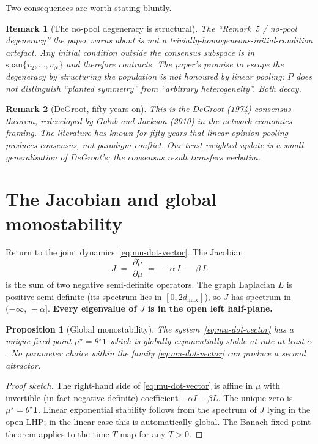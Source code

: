 \documentclass[11pt,a4paper]{article}
\theoremstyle{plain}
\newtheorem{proposition}{Proposition}
\newtheorem{remark}{Remark}
\begin{document}
Two consequences are worth stating bluntly.

\begin{remark}[The no-pool degeneracy is structural]
The ``Remark~5 / no-pool degeneracy'' the paper warns about is not a
trivially-homogeneous-initial-condition artefact. \emph{Any} initial
condition outside the consensus subspace is in $\mathrm{span}\{v_2,
\dots, v_N\}$ and therefore contracts. The paper's promise to escape
the degeneracy by structuring the population is not honoured by linear
pooling: $P$ does not distinguish ``planted symmetry'' from ``arbitrary
heterogeneity''. Both decay.
\end{remark}

\begin{remark}[DeGroot, fifty years on]
This is the DeGroot (1974) consensus theorem, redeveloped by Golub and
Jackson (2010) in the network-economics framing. The literature has
known for fifty years that linear opinion pooling produces consensus,
not paradigm conflict. Our trust-weighted update is a small
generalisation of DeGroot's; the consensus result transfers verbatim.
\end{remark}

\section{The Jacobian and global monostability}
\label{sec:jacobian}

Return to the joint dynamics~\eqref{eq:mu-dot-vector}. The Jacobian
\[
J \;=\; \frac{\partial \dot{\mu}}{\partial \mu}
   \;=\; -\alpha\, I \;-\; \beta\, L
\]
is the sum of two negative semi-definite operators. The graph Laplacian
$L$ is positive semi-definite (its spectrum lies in $[0, 2 d_{\max}]$),
so $J$ has spectrum in $(-\infty,\,-\alpha]$. \textbf{Every eigenvalue
of $J$ is in the open left half-plane.}

\begin{proposition}[Global monostability]
\label{prop:mono}
The system~\eqref{eq:mu-dot-vector} has a unique fixed point
$\mu^\star = \theta^\star \mathbf{1}$ which is globally exponentially
stable at rate at least $\alpha$. No parameter choice within the family
\eqref{eq:mu-dot-vector} can produce a second attractor.
\end{proposition}

\begin{proof}[Proof sketch]
The right-hand side of \eqref{eq:mu-dot-vector} is affine in $\mu$ with
invertible (in fact negative-definite) coefficient $-\alpha I - \beta L$.
The unique zero is $\mu^\star = \theta^\star \mathbf{1}$. Linear
exponential stability follows from the spectrum of $J$ lying in the
open LHP; in the linear case this is automatically global. The
Banach fixed-point theorem applies to the time-$T$ map for any $T>0$.
\end{proof}
\end{document}
